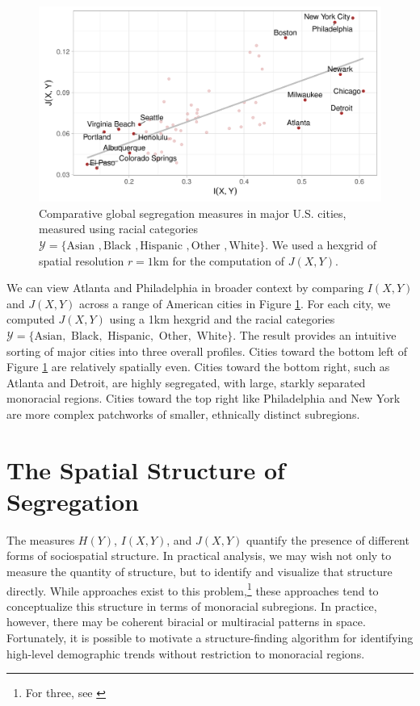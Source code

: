 \documentclass[english]{scrartcl}
\begin{document}
		\begin{figure}
			\includegraphics[width=\textwidth]{figs/mutual_fisher.pdf}
			\caption{Comparative global segregation measures in major U.S. cities, measured using racial categories $\mathcal{Y} = \{\text{Asian }, \text{Black }, \text{Hispanic }, \text{Other }, \text{White}\}$. We used a hexgrid of spatial resolution $r = 1$km for the computation of $J(X,Y)$.} \label{fig:mutual_fisher}
		\end{figure}

		We can view Atlanta and Philadelphia in broader context by comparing $I(X,Y)$ and $J(X,Y)$ across a range of American cities in Figure \ref{fig:mutual_fisher}. For each city, we computed $J(X,Y)$ using a 1km hexgrid and the racial categories $\mathcal{Y} = \{\text{Asian}, \text{ Black}, \text{ Hispanic}, \text{ Other}, \text{ White}\}$. The result provides an intuitive sorting of major cities into three overall profiles. Cities toward the bottom left of Figure \ref{fig:mutual_fisher} are relatively spatially even. Cities toward the bottom right, such as Atlanta and Detroit, are highly segregated, with large, starkly separated monoracial regions. Cities toward the top right like Philadelphia and New York are more complex patchworks of smaller, ethnically distinct subregions.  

		


\section{The Spatial Structure of Segregation} \label{sec:id}
	

	The measures $H(Y)$, $I(X,Y)$, and $J(X,Y)$ quantify the presence of different forms of sociospatial structure. In practical analysis, we may wish not only to measure the quantity of structure, but to identify and visualize that structure directly. While approaches exist to this problem,\footnote{For three, see \cite{Logan2011}} these approaches tend to conceptualize this structure in terms of monoracial subregions. In practice, however, there may be coherent biracial or multiracial patterns in space. Fortunately, it is possible to motivate a structure-finding algorithm for identifying high-level demographic trends without restriction to monoracial regions. 
\end{document}
